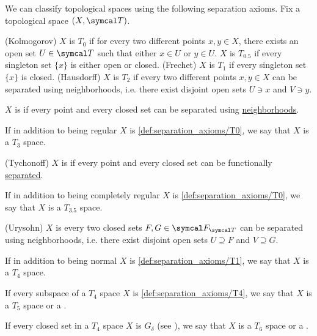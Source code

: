 \begin{Definition}\label{def:separation_axioms}
  We can classify topological spaces using the following separation axioms. Fix a topological space \( (X, \Cal{T}) \).

  \begin{RefList}
     (Kolmogorov) \( X \) is \( T_0 \) if for every two different points \( x, y \in X \), there exists an open set \( U \in \Cal{T} \) such that either \( x \in U \) or \( y \in U \).
     \( X \) is \( T_{0.5} \) if every singleton set \( \{ x \} \) is either open or closed.
     (Frechet) \( X \) is \( T_1 \) if every singleton set \( \{ x \} \) is closed.
     (Hausdorff) \( X \) is \( T_2 \) if every two different points \( x, y \in X \) can be separated using neighborhoods, i.e. there exist disjoint open sets \( U \ni x \) and \( V \ni y \).

     \( X \) is  if every point and every closed set can be separated using \hyperref[def:topological_space_separation]{neighborhoods}.

    If in addition to being regular \( X \) is \ref{def:separation_axioms/T0}, we say that \( X \) is a \( T_3 \) space.

     (Tychonoff) \( X \) is  if every point and every closed set can be functionally \hyperref[def:topological_space_separation]{separated}.

    If in addition to being completely regular \( X \) is \ref{def:separation_axioms/T0}, we say that \( X \) is a \( T_{3.5} \) space.

    (Urysohn) \( X \) is  every two closed sets \( F, G \in \Cal{F}_{\Cal{T}} \) can be separated using neighborhoods, i.e. there exist disjoint open sets \( U \supseteq F \) and \( V \supseteq G \).

    If in addition to being normal \( X \) is \ref{def:separation_axioms/T1}, we say that \( X \) is a \( T_4 \) space.

     If every subspace of a \( T_4 \) space \( X \) is \ref{def:separation_axioms/T4}, we say that \( X \) is a \( T_5 \) space or a .

     If every closed set in a \( T_4 \) space \( X \) is \( G_\delta \) (see ), we say that \( X \) is a \( T_6 \) space or a .
  \end{RefList}
\end{Definition}

